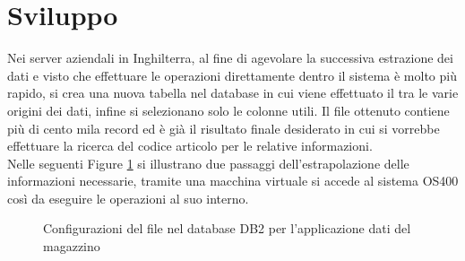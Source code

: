 \section{Sviluppo} \label{sec:1App-Sviluppo}
Nei server aziendali in Inghilterra, al fine di agevolare la successiva estrazione dei dati e visto che effettuare le operazioni direttamente dentro il sistema  è molto più rapido, si crea una nuova tabella nel database  in cui viene effettuato il  tra le varie origini dei dati, infine si selezionano solo le colonne utili.
Il file ottenuto contiene più di cento mila record ed è già il risultato finale desiderato in cui si vorrebbe effettuare la ricerca del codice articolo per le relative informazioni. 
\\Nelle seguenti Figure \ref*{fig:M-DB2} si illustrano due passaggi dell'estrapolazione delle informazioni necessarie, tramite una macchina virtuale si accede al sistema OS400 così da eseguire le operazioni al suo interno.\\ 
\begin{figure}[H]
  \centering{}\qquad
  \centering{}
  \caption{Configurazioni del file nel database DB2 per l'applicazione dati del magazzino}
  \label{fig:M-DB2}
\end{figure}
